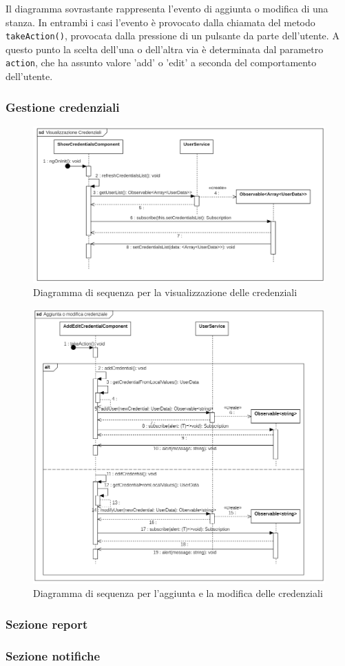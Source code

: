 Il diagramma sovrastante rappresenta l'evento di aggiunta o modifica di una stanza.
In entrambi i casi l'evento è provocato dalla chiamata del metodo \texttt{takeAction()}, provocata dalla pressione di un pulsante da parte dell'utente. A questo punto la scelta dell'una o dell'altra via è determinata dal parametro \texttt{action}, che ha assunto valore 'add' o 'edit' a seconda del comportamento dell'utente.
\subsubsection{Gestione credenziali}
\begin{figure}[H]
	\centering
	\includegraphics[width=18cm]{res/images/webapp-showCredentials-diagrammaSequenza.png}
	\caption{Diagramma di sequenza per la visualizzazione delle credenziali}
	\label{fig:DiagrammaSequenzaVisualizzazioneCredenziali}
\end{figure}
\begin{figure}[H]
	\centering
	\includegraphics[width=18cm]{res/images/webapp-credenzialiAddEdit-diagrammaSequenza.png}
	\caption{Diagramma di sequenza per l'aggiunta e la modifica delle credenziali}
	\label{fig:DiagrammaSequenzaVisualizzazioneCredenziali}
\end{figure}
\subsubsection{Sezione report}
\subsubsection{Sezione notifiche}



